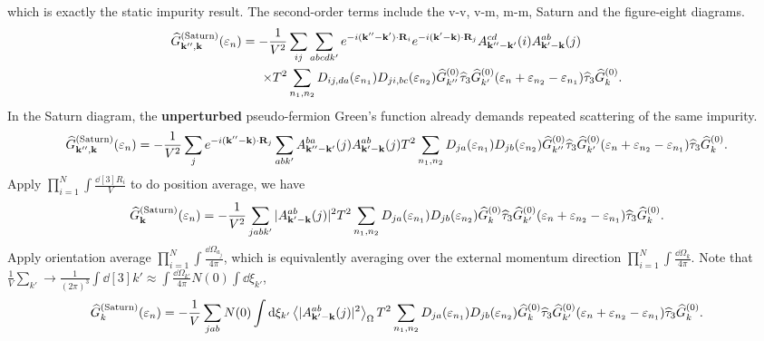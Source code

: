 \documentclass[]{article}
\begin{document}
which is exactly the static impurity result.
The second-order terms include the v-v, v-m, m-m, Saturn and the figure-eight diagrams.
\begin{align}\label{self-energy}
    \widehat{G}^{(\text{Saturn})}_{\vb{k}'',\vb{k}}(\varepsilon_n)
    =-\frac{1}{V^2}&\sum_{ij}\sum_{abcdk'}
    e^{-i(\vb{k}''-\vb{k}')\cdot\vb{R}_i}
    e^{-i(\vb{k}'-\vb{k})\cdot\vb{R}_j}
    A_{\vb{k}''-\vb{k}'}^{cd}(i) A_{\vb{k}'-\vb{k}}^{ab}(j)\nonumber\\
    \times
    T^2&\sum_{n_1,n_2}
    D_{ij,da}(\varepsilon_{n_1})D_{ji,bc}(\varepsilon_{n_2})
    \widehat{G}^{(0)}_{k''}\widehat{\tau}_3
    \widehat{G}^{(0)}_{k'}(\varepsilon_n+\varepsilon_{n_2}-\varepsilon_{n_1})
    \widehat{\tau}_3
    \widehat{G}^{(0)}_k.
\end{align}
In the Saturn diagram, the \textbf{unperturbed} pseudo-fermion Green's function already demands repeated scattering of the same impurity.
\begin{align}
    \widehat{G}^{(\text{Saturn})}_{\vb{k}'',\vb{k}}(\varepsilon_n)
  =-\frac{1}{V^2}\sum_{j}e^{-i(\vb{k}''-\vb{k})\cdot\vb{R}_j}
  \sum_{abk'}
  A_{\vb{k}''-\vb{k}'}^{ba}(j)A_{\vb{k}'-\vb{k}}^{ab}(j)
  T^2\sum_{n_1,n_2}
  D_{ja}(\varepsilon_{n_1})D_{jb}(\varepsilon_{n_2})
  \widehat{G}^{(0)}_{k''}\widehat{\tau}_3
  \widehat{G}^{(0)}_{k'}(\varepsilon_n+\varepsilon_{n_2}-\varepsilon_{n_1})
  \widehat{\tau}_3
  \widehat{G}^{(0)}_k.
\end{align}
Apply $\prod_{i=1}^{N}\int\frac{\dd[3]{R_i}}{V}$ to do position average, we have
\begin{align}
    \widehat{G}^{(\text{Saturn})}_{\vb{k}}(\varepsilon_n)
    = -\frac{1}{V^2}\sum_{jabk'}|A^{ab}_{\vb{k}'-\vb{k}}(j)|^2
    T^2\sum_{n_1,n_2}
    D_{ja}(\varepsilon_{n_1})D_{jb}(\varepsilon_{n_2})
    \widehat{G}^{(0)}_k\widehat{\tau}_3
    \widehat{G}^{(0)}_{k'}(\varepsilon_n+\varepsilon_{n_2}-\varepsilon_{n_1})
    \widehat{\tau}_3
    \widehat{G}^{(0)}_k.
\end{align}
Apply orientation average $\prod_{i=1}^{N}\int\frac{\dd\Omega_{a_j}}{4\pi}$,
which is equivalently averaging over the external momentum direction $\prod_{i=1}^{N}\int\frac{\dd\Omega_k}{4\pi}$.
Note that $\frac{1}{V}\sum_{k'}\rightarrow\frac{1}{(2\pi)^3}\int\dd[3]{k'}\approx\int\frac{\dd\Omega_{k'}}{4\pi}N(0)\int\dd\xi_{k'}$,
\begin{align}
    \widehat{G}^{(\text{Saturn})}_{k}(\varepsilon_n)
    = -\frac{1}{V}\sum_{jab}N(0)\int\dd\xi_{k'}
    \ev{|A^{ab}_{\vb{k}'-\vb{k}}(j)|^2}_\Omega
    T^2\sum_{n_1,n_2}
    D_{ja}(\varepsilon_{n_1})D_{jb}(\varepsilon_{n_2})
    \widehat{G}^{(0)}_k\widehat{\tau}_3
    \widehat{G}^{(0)}_{k'}(\varepsilon_n+\varepsilon_{n_2}-\varepsilon_{n_1})
    \widehat{\tau}_3
    \widehat{G}^{(0)}_k.
\end{align}
\end{document}
